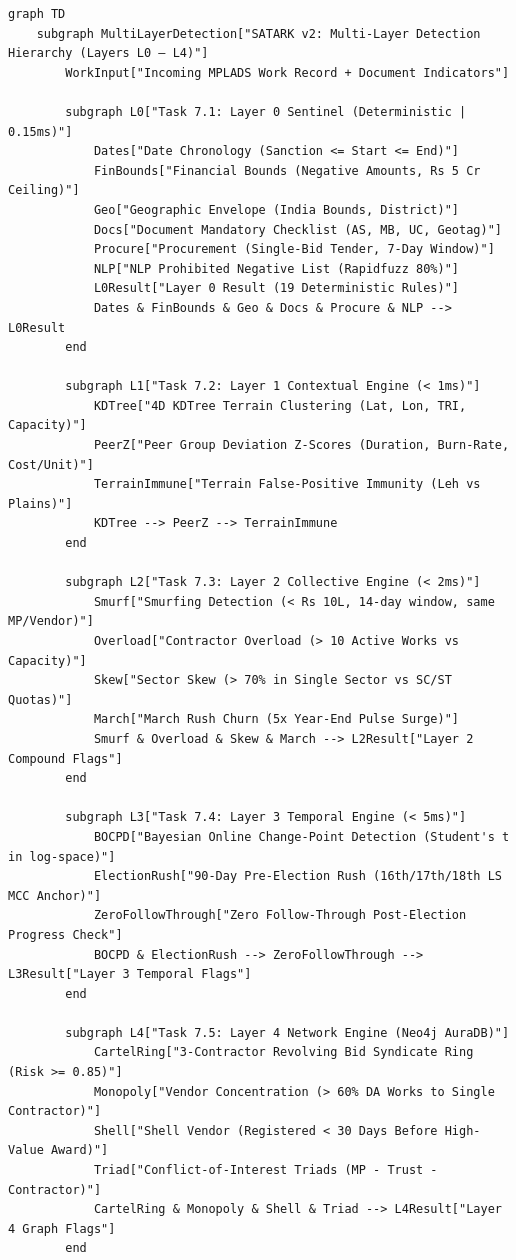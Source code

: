 \documentclass[11pt,a4paper]{article}
\begin{document}
\begin{tcolorbox}[colback=gray!5!white,colframe=gray!60!black,arc=1mm,boxrule=0.6pt,left=6pt,right=6pt,top=6pt,bottom=6pt]
\begin{lstlisting}[basicstyle=\ttfamily\scriptsize,breaklines=true,columns=flexible]
graph TD
    subgraph MultiLayerDetection["SATARK v2: Multi-Layer Detection Hierarchy (Layers L0 – L4)"]
        WorkInput["Incoming MPLADS Work Record + Document Indicators"]
        
        subgraph L0["Task 7.1: Layer 0 Sentinel (Deterministic | 0.15ms)"]
            Dates["Date Chronology (Sanction <= Start <= End)"]
            FinBounds["Financial Bounds (Negative Amounts, Rs 5 Cr Ceiling)"]
            Geo["Geographic Envelope (India Bounds, District)"]
            Docs["Document Mandatory Checklist (AS, MB, UC, Geotag)"]
            Procure["Procurement (Single-Bid Tender, 7-Day Window)"]
            NLP["NLP Prohibited Negative List (Rapidfuzz 80%)"]
            L0Result["Layer 0 Result (19 Deterministic Rules)"]
            Dates & FinBounds & Geo & Docs & Procure & NLP --> L0Result
        end

        subgraph L1["Task 7.2: Layer 1 Contextual Engine (< 1ms)"]
            KDTree["4D KDTree Terrain Clustering (Lat, Lon, TRI, Capacity)"]
            PeerZ["Peer Group Deviation Z-Scores (Duration, Burn-Rate, Cost/Unit)"]
            TerrainImmune["Terrain False-Positive Immunity (Leh vs Plains)"]
            KDTree --> PeerZ --> TerrainImmune
        end

        subgraph L2["Task 7.3: Layer 2 Collective Engine (< 2ms)"]
            Smurf["Smurfing Detection (< Rs 10L, 14-day window, same MP/Vendor)"]
            Overload["Contractor Overload (> 10 Active Works vs Capacity)"]
            Skew["Sector Skew (> 70% in Single Sector vs SC/ST Quotas)"]
            March["March Rush Churn (5x Year-End Pulse Surge)"]
            Smurf & Overload & Skew & March --> L2Result["Layer 2 Compound Flags"]
        end

        subgraph L3["Task 7.4: Layer 3 Temporal Engine (< 5ms)"]
            BOCPD["Bayesian Online Change-Point Detection (Student's t in log-space)"]
            ElectionRush["90-Day Pre-Election Rush (16th/17th/18th LS MCC Anchor)"]
            ZeroFollowThrough["Zero Follow-Through Post-Election Progress Check"]
            BOCPD & ElectionRush --> ZeroFollowThrough --> L3Result["Layer 3 Temporal Flags"]
        end

        subgraph L4["Task 7.5: Layer 4 Network Engine (Neo4j AuraDB)"]
            CartelRing["3-Contractor Revolving Bid Syndicate Ring (Risk >= 0.85)"]
            Monopoly["Vendor Concentration (> 60% DA Works to Single Contractor)"]
            Shell["Shell Vendor (Registered < 30 Days Before High-Value Award)"]
            Triad["Conflict-of-Interest Triads (MP - Trust - Contractor)"]
            CartelRing & Monopoly & Shell & Triad --> L4Result["Layer 4 Graph Flags"]
        end


\end{lstlisting}
\end{tcolorbox}
\end{document}
